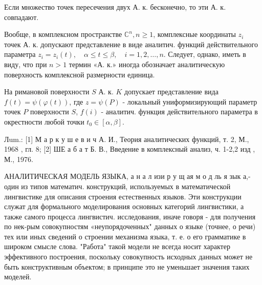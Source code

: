 \documentclass[10pt]{article}
\begin{document}
Если множество точек пересечения двух А. к. бесконечно, то эти А. к. совпадают.



Вообще, в комплексном пространстве $\mathbb{C}^{n}, n \geqslant 1$, комплексные координаты $z_{i}$ точек А. к. допускают представление в виде аналитич. функций действительного параметра $z_{i}=z_{i}(t), \quad \alpha \leqslant t \leqslant \beta, \quad i=1,2, \ldots, n$. Следует, однако, иметь в виду, что при $n>1$ термин «А. к.» иногда обозначает аналитическую поверхность комплексной размерности единица.



На римановой поверхности $S$ А. к. $K$ допускает представление вида $f(t)=\psi(\varphi(t))$, где $z=\psi(P)$ - локальный униформизирующий параметр точек $P$ поверхности $S$, $f(i)$ - аналитич. функция действительного параметра в окрестности любой точки $t_{0} \in[\alpha, \beta]$.



Лum.: [1] М а р к у ш е в и ч А. И., Теория аналитических функций, т. 2, М., 1968 , гл. 8; [2] ШЕ а б а т Б. В., Введение в комплексный анализ, ч. 1-2,2 изд , М., 1976.



АНАЛИТИЧЕСКАЯ МОДЕЛЬ ЯЗЫКА, а н а л изи р у щ ая м о д ль я зык а,- один из типов математич. конструкций, используемых в математической лингвистике для описания строения естественных языков. Эти конструкции служат для формального моделирования основных категорий лингвистики, а также самого процесса лингвистич. исследования, иначе говоря - для получения по нек-рым совокупностям «неупорядоченных" данных о языке (точнее, о речи) тех или иных сведений о строении механизма языка, т. е. о его грамматике в широком смысле слова. "Работа" такой модели не всегда носит характер эффективного построения, поскольку совокупность исходных данных может не быть конструктивным объектом; в принципе это не уменьшает значения таких моделей.
\end{document}
